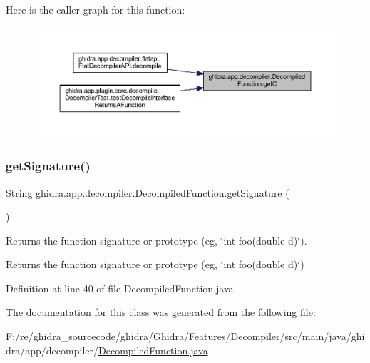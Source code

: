 Here is the caller graph for this function\+:
\nopagebreak
\begin{figure}[H]
\begin{center}
\leavevmode
\includegraphics[width=350pt]{classghidra_1_1app_1_1decompiler_1_1_decompiled_function_a43056f99e19bc160c0fb94c2b7e26049_icgraph}
\end{center}
\end{figure}
\mbox{\label{classghidra_1_1app_1_1decompiler_1_1_decompiled_function_a38bc736bc8898d62849f4c53be63492d}} 
\subsubsection{\texorpdfstring{getSignature()}{getSignature()}}
{\footnotesize\ttfamily String ghidra.\+app.\+decompiler.\+Decompiled\+Function.\+get\+Signature (\begin{DoxyParamCaption}{ }\end{DoxyParamCaption})\hspace{0.3cm}{\ttfamily [inline]}}

Returns the function signature or prototype (eg, \char`\"{}int foo(double d)\char`\"{}). \begin{DoxyReturn}{Returns}
the function signature or prototype (eg, \char`\"{}int foo(double d)\char`\"{}) 
\end{DoxyReturn}


Definition at line 40 of file Decompiled\+Function.\+java.



The documentation for this class was generated from the following file\+:\begin{DoxyCompactItemize}
\item 
F\+:/re/ghidra\+\_\+sourcecode/ghidra/\+Ghidra/\+Features/\+Decompiler/src/main/java/ghidra/app/decompiler/\mbox{\hyperlink{_decompiled_function_8java}{Decompiled\+Function.\+java}}\end{DoxyCompactItemize}
